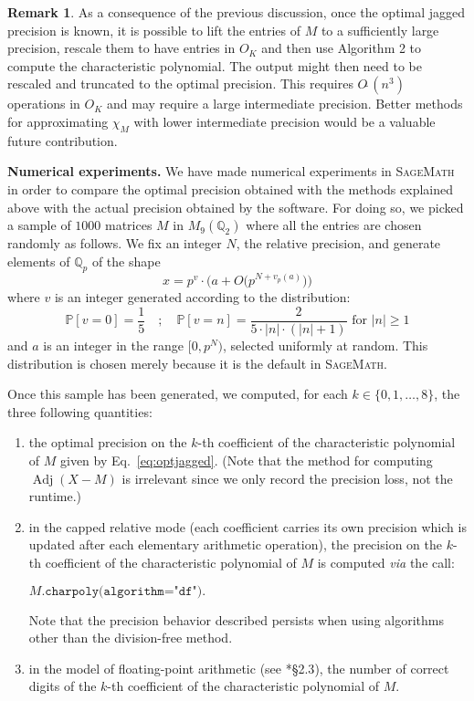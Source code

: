 \documentclass[sigconf]{acmart}
\DeclareMathOperator{\adj}{Adj}
\newcommand{\Q}{\mathbb Q}
\newcommand{\softO}{O\tilde{~}}
\theoremstyle{definition}
\newtheorem{rem}[theo]{Remark}
\begin{document}
\begin{rem} \label{rem:lift_for_optimal}
As a consequence of the previous discussion, once the optimal jagged 
precision is known, it is possible to lift the entries of $M$ to a sufficiently
large precision, rescale them to have entries in $O_K$
and then use Algorithm 2 to
compute the characteristic polynomial.
The output might then need to be rescaled and
 truncated to the optimal precision. 
This requires $\softO(n^3)$ operations in $O_K$ 
and may require a large intermediate precision.
Better methods for approximating $\chi_M$ with
lower intermediate precision would be a valuable
future contribution.
\end{rem}

\medskip

\noindent
{\bf Numerical experiments.}
We have made numerical experiments in \textsc{SageMath}~\cite{sage}
in order to compare the optimal precision obtained with the methods
explained above with the actual precision obtained by the software.
For doing so, we picked a sample of $1000$ matrices $M$ in 
$M_9(\Q_2)$ where all the entries are chosen randomly as follows.
We fix an integer $N$, the relative precision, and generate elements of $\Q_p$ of the shape
\[
x = p^v \cdot \big(a + O\big(p^{N+v_p(a)}\big)\big)
\]
where $v$ is an integer generated according to the distribution:
\[
\mathbb P [v = 0] = \frac 1 5 \quad ; \quad
\mathbb P [v = n] = \frac 2 {5\cdot |n| \cdot (|n|+1)} \text{ for }
|n| \geq 1
\]
and $a$ is an integer in the range $[0, p^N)$, selected uniformly at random.
This distribution is chosen merely because it is the default in \textsc{SageMath}.

Once this sample has been generated, we computed, for each $k \in \{0, 
1, \ldots, 8\}$, the three following quantities:

\vspace{-2mm}

\begin{enumerate}[$\bullet$]
\renewcommand{\itemsep}{0pt}
\item the optimal precision on the $k$-th coefficient of the 
characteristic polynomial of $M$ given by Eq.~\eqref{eq:optjagged}.
(Note that the method for computing $\adj(X{-}M)$ is irrelevant
since we only record the precision loss, not the runtime.)
\item in the capped relative mode (each 
coefficient carries its own precision which is updated after each 
elementary arithmetic operation),
the precision on the $k$-th coefficient of the 
characteristic polynomial of $M$ is computed \emph{via} the call:

\hfill$M\texttt{.charpoly(algorithm="df")}.$\hfill\null

Note that the precision behavior described persists when using algorithms
other than the division-free method.

\item in the model of floating-point arithmetic (see 
\cite{caruso:17a}*{\S 2.3}), the number of correct digits of the 
$k$-th coefficient of the characteristic polynomial of $M$.
\end{enumerate}
\end{document}
